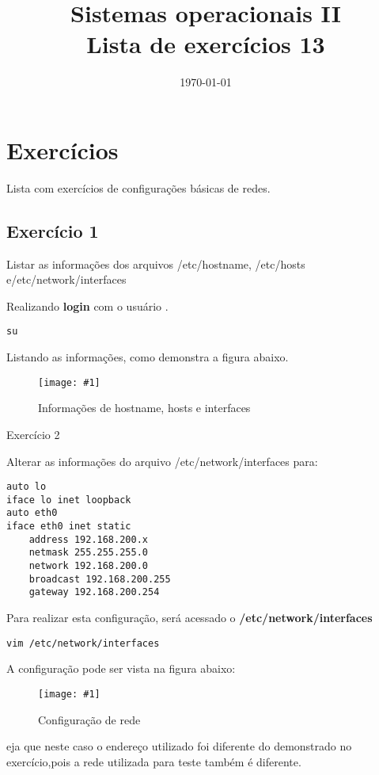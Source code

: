 \documentclass[
	12pt,				%
	openany,			%
	a4paper,			%
	chapter=TITLE,		%
	section=TITLE,		%
	english,
	brazil				%
]{abntex2}
\title{Sistemas operacionais II \\ Lista de exercícios 13}
\date{\today}
\newcommand{\imagem}[3]{
	\begin{figure}[htb]
		\begin{center}
			\texttt{[image: \#1]}
		\end{center}
		\caption{#2}	%
	\end{figure}
}
\begin{document}
\maketitle

\chapter{Exercícios}

Lista com exercícios de configurações básicas de redes.

\section{Exercício 1}

Listar as informações dos arquivos /etc/hostname, /etc/hosts e/etc/network/interfaces

Realizando \textbf{login} com o usuário .
\begin{lstlisting}
su
\end{lstlisting}

Listando as informações, como demonstra a figura abaixo.

\imagem{exe_1.png}{Informações de hostname, hosts e interfaces}

\section{Exercício 2}

Alterar as informações do arquivo /etc/network/interfaces para:

\begin{lstlisting}
auto lo
iface lo inet loopback
auto eth0
iface eth0 inet static
    address 192.168.200.x
    netmask 255.255.255.0
    network 192.168.200.0
    broadcast 192.168.200.255
    gateway 192.168.200.254
\end{lstlisting}

Para realizar esta configuração, será acessado o \textbf{/etc/network/interfaces}

\begin{lstlisting}
vim /etc/network/interfaces
\end{lstlisting}

A configuração pode ser vista na figura abaixo:

\imagem{exe_2.png}{Configuração de rede}

Veja que neste caso o endereço utilizado foi diferente do demonstrado no exercício,pois a rede utilizada para teste também é diferente.
\end{document}
